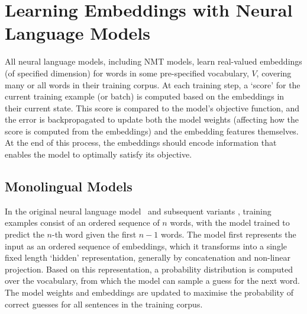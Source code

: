 
\section{Learning Embeddings with Neural Language Models}

All neural language models, including NMT models, learn real-valued embeddings (of specified dimension) for words in some pre-specified vocabulary, \(V\), covering many or all words in their training corpus. At each training step, a `score' for the current training example (or batch) is computed based on the embeddings in their current state. This score is compared to the model's objective function, and the error is backpropagated to update both the model weights (affecting how the score is computed from the embeddings) and the embedding features themselves. At the end of this process, the embeddings should encode information that enables the model to optimally satisfy its objective.     

\subsection{Monolingual Models}

In the original neural language model~\cite{Bengio2003lm} and subsequent
variants \cite{collobert2008unified}, training examples consist of an ordered sequence of $n$ words,
with the model trained to predict the $n$-th word given the first $n-1$
words. The model first represents the input as an ordered sequence of embeddings,
which it transforms into a single fixed length `hidden' representation, generally by concatenation and non-linear projection.
Based on this representation, a probability distribution is
computed over the vocabulary, from which the model can sample a guess for the
next word. The model weights and embeddings are updated to maximise the
probability of correct guesses for all sentences in the
training corpus. 
 
